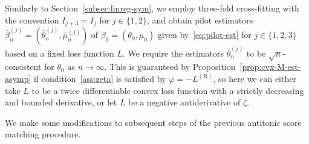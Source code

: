 \documentclass[a4paper]{article}
\theoremstyle{definition}
\begin{document}
Similarly to Section~\ref{subsec:linreg-sym}, we employ three-fold cross-fitting with the convention $I_{j+3} = I_j$ for $j \in \{1,2\}$, and obtain pilot estimators $\bar{\beta}_n^{(j)} = (\bar{\theta}_n^{(j)},\bar{\mu}_n^{(j)})$ of $\beta_0 = (\theta_0,\mu_0)$ given by~\eqref{eq:pilot-est} for $j \in \{1,2,3\}$ based on a fixed loss function $L$. We require the estimators $\bar{\theta}_n^{(j)}$ to be $\sqrt{n}$-consistent for $\theta_0$ as $n \to \infty$. This is guaranteed by Proposition~\ref{prop:cvx-M-est-asymp} if condition~\ref{ass:zeta} is satisfied by $\varphi = -L^{(\mathrm{R})}$, so here we can either take $L$ to be a twice differentiable convex loss function with a strictly decreasing and bounded derivative, or let $L$ be a negative antiderivative of $\zeta$.

We make some modifications to subsequent steps of the previous antitonic score matching procedure.
\end{document}
